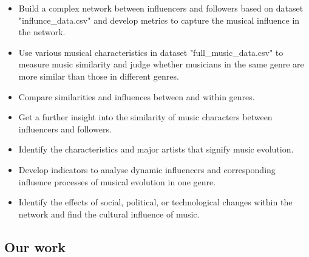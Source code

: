\documentclass[12pt]{article}  %
\begin{document}
	\begin{itemize}
		\setlength{\parsep}{0ex} %
		\setlength{\topsep}{2ex} %
		\setlength{\itemsep}{1ex} %
		\item Build a complex network between influencers and followers based on dataset "influnce\_data.csv" and develop metrics to capture the musical influence in the network. 
		\item Use various musical characteristics in dataset "full\_music\_data.csv" to measure music similarity and judge whether musicians in the same genre are more similar than those in different genres.
		\item Compare similarities and influences between and within genres.
		\item Get a further insight into the similarity of music characters between influencers and followers.
		\item Identify the characteristics and major artists that signify music evolution. 
		\item Develop indicators to analyse dynamic influencers and corresponding influence processes of musical evolution in one genre.
		\item Identify the effects of social, political, or technological changes within the network and find the cultural influence of music. 
	\end{itemize}
	
	
	
	\subsection{Our work}
	
\end{document}
